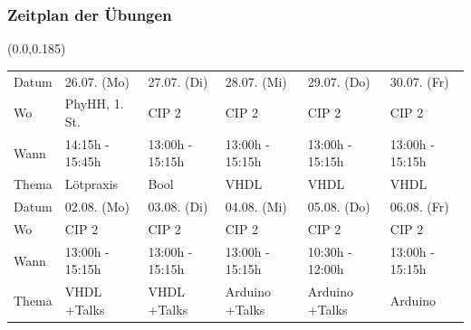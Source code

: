 \documentclass[aspectratio=169, 14pt]{beamer}
\begin{document}
\begin{frame}
    \frametitle{Zeitplan der Übungen}
    \begin{textblock*}{\paperwidth}(0.0\paperwidth,0.185\paperheight)
        {\fontsize{12}{10}\selectfont
        \begin{tabular}{L{0.10\paperwidth}|C{0.15\paperwidth}C{0.15\paperwidth}C{0.15\paperwidth}C{0.15\paperwidth}C{0.15\paperwidth}}
        \toprule
        \toprule
        Datum  & 26.07. (Mo)       & 27.07. (Di)          & 28.07. (Mi)        & 29.07. (Do)        & 30.07. (Fr) \\[2.0 mm]
        Wo     & PhyHH, 1. St.     & CIP 2                & CIP 2              & CIP 2              & CIP 2 \\[2.0 mm]
        Wann   & 14:15h - 15:45h   & 13:00h - 15:15h      & 13:00h - 15:15h    & 13:00h - 15:15h    & 13:00h - 15:15h \\[2.0 mm]
        Thema  & Lötpraxis         & Bool                 & VHDL               & VHDL               & VHDL \\
        \midrule
        \midrule
        Datum  & 02.08. (Mo)       & 03.08. (Di)          & 04.08. (Mi)        & 05.08. (Do)        & 06.08. (Fr) \\[2.0 mm]
        Wo     & CIP 2             & CIP 2                & CIP 2              & CIP 2              & CIP 2 \\[2.0 mm]
        Wann   & 13:00h - 15:15h   & 13:00h - 15:15h      & 13:00h - 15:15h    & 10:30h - 12:00h    & 13:00h - 15:15h \\[2.0 mm]
        Thema  & VHDL +Talks       & VHDL +Talks          & Arduino +Talks     & Arduino +Talks     & Arduino \\
        \bottomrule
        \bottomrule
        \end{tabular}
        }
    \end{textblock*}
    \framenumber
\end{frame}
\end{document}
